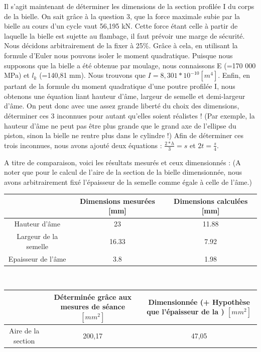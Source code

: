 \documentclass[a4paper,oneside,12pt]{report}
\begin{document}
Il s'agit maintenant de déterminer les dimensions de la section profilée I du corps de la bielle. On sait grâce à la question 3, que la force maximale subie par la bielle au cours d'un cycle vaut 56,195 kN. Cette force étant celle à partir de laquelle la bielle est sujette au flambage, il faut prévoir une marge de sécurité. Nous décidons arbitrairement de la fixer à 25\%. Grâce à cela, en utilisant la formule d'Euler nous pouvons isoler le moment quadratique. Puisque nous supposons que la bielle a été obtenue par moulage, nous connaissons E (=170 000 MPa) et $l_k$ (=140,81 mm). Nous trouvons que $I = 8,301*10^{-10} [m^4]$. Enfin, en partant de la formule du moment quadratique d'une poutre profilée I, nous obtenons une équation liant hauteur d'âme, largeur de semelle et demi-largeur d'âme. On peut donc avec une assez grande liberté du choix des dimensions, déterminer ces 3 inconnues pour autant qu'elles soient réalistes ! (Par exemple, la hauteur d'âme ne peut pas être plus grande que le grand axe de l'ellipse du piston, sinon la bielle ne rentre plus dans le cylindre !)
Afin de déterminer ces trois inconnues, nous avons ajouté deux équations : $\frac{2*h}{3} = s$ et $2t=\frac{s}{4}$.

A titre de comparaison, voici les résultats mesurés et ceux dimensionnés :
(A noter que pour le calcul de l'aire de la section de la bielle dimensionnée, nous avons arbitrairement fixé l'épaisseur de la semelle comme égale à celle de l'âme.)
\begin{center}
\begin{tabular}{|c||c|c|}
\hline 
\ & Dimensions mesurées [mm]  & Dimensions calculées [mm] \\ 
\hline 
Hauteur d'âme & 23 & 11.88 \\ 
\hline 
Largeur de la semelle & 16.33 & 7.92 \\ 
\hline 
Epaisseur de l'âme & 3.8 & 1.98 \\
\hline
\end{tabular} \\
\end{center}
\begin{center}
\begin{tabular}{|c||c|c|}
\hline 
\ & Déterminée grâce aux mesures de séance $[mm^2]$ & Dimensionnée (+ Hypothèse que l'épaisseur de la ) $[mm^2]$ \\
\hline
Aire de la section & 200,17  &  47,05 \\
\end{tabular}
\end{center}
\end{document}
